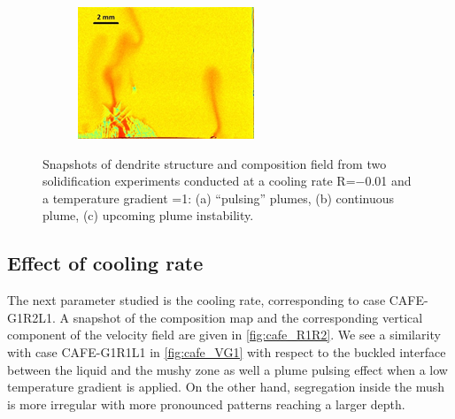 \begin{figure}[htbp]
\begin{subfigure}{0.3\textwidth}
    \centering
	\includegraphics[width=\textwidth]{Chapter4/Graphics/freckle_exp/exp_instability.png}
	\caption{}
    \label{fig:exp_instability}
  \end{subfigure}
\caption{Snapshots of dendrite structure and composition field from two 
solidification experiments conducted at a cooling rate 
R=\SI{-0.01}{\uCR} and a temperature gradient =\SI{1}{\ugradT}: (a) “pulsing” plumes, 
(b) continuous plume, (c) upcoming plume instability.} 
\label{fig:experimental_freckles_regimes}
\end{figure}


\subsection{Effect of cooling rate}

The next parameter studied is the cooling rate, corresponding to case CAFE-G1R2L1. A snapshot of the composition map 
and the corresponding vertical component of the velocity field are given in \cref{fig:cafe_R1R2}. We see a similarity 
with case CAFE-G1R1L1 in \cref{fig:cafe_VG1} with respect to the buckled interface between the liquid and the mushy 
zone as well a plume pulsing effect when a low temperature gradient is applied. On the other hand, segregation inside 
the mush is more irregular with more pronounced patterns reaching a larger depth. 

